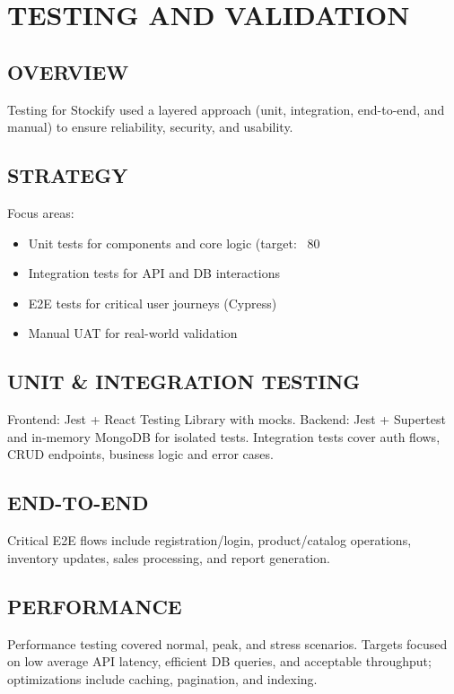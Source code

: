 
\chapter{TESTING AND VALIDATION}

\section{OVERVIEW}

Testing for Stockify used a layered approach (unit, integration, end-to-end, and manual) to ensure reliability, security, and usability.

\section{STRATEGY}

Focus areas:
\begin{itemize}
	\item Unit tests for components and core logic (target: ~80%
	\item Integration tests for API and DB interactions
	\item E2E tests for critical user journeys (Cypress)
	\item Manual UAT for real-world validation
\end{itemize}

\section{UNIT \& INTEGRATION TESTING}

Frontend: Jest + React Testing Library with mocks. Backend: Jest + Supertest and in-memory MongoDB for isolated tests. Integration tests cover auth flows, CRUD endpoints, business logic and error cases.

\section{END-TO-END}

Critical E2E flows include registration/login, product/catalog operations, inventory updates, sales processing, and report generation.

\section{PERFORMANCE}

Performance testing covered normal, peak, and stress scenarios. Targets focused on low average API latency, efficient DB queries, and acceptable throughput; optimizations include caching, pagination, and indexing.

